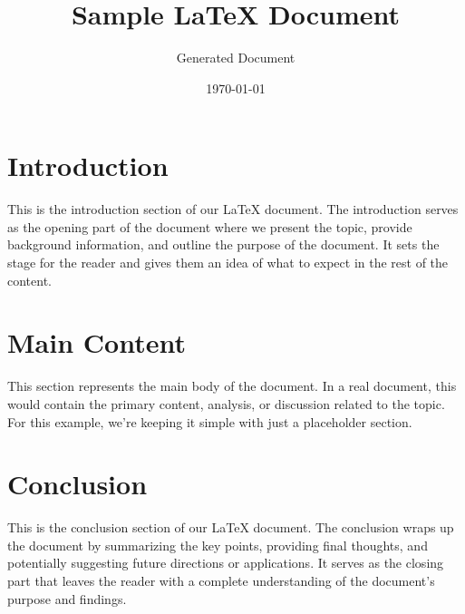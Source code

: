 \documentclass{article}
\title{Sample LaTeX Document}
\author{Generated Document}
\date{\today}
\begin{document}
\maketitle

\section{Introduction}
This is the introduction section of our LaTeX document. The introduction serves as the opening part of the document where we present the topic, provide background information, and outline the purpose of the document. It sets the stage for the reader and gives them an idea of what to expect in the rest of the content.

\section{Main Content}
This section represents the main body of the document. In a real document, this would contain the primary content, analysis, or discussion related to the topic. For this example, we're keeping it simple with just a placeholder section.

\section{Conclusion}
This is the conclusion section of our LaTeX document. The conclusion wraps up the document by summarizing the key points, providing final thoughts, and potentially suggesting future directions or applications. It serves as the closing part that leaves the reader with a complete understanding of the document's purpose and findings.
\end{document}
